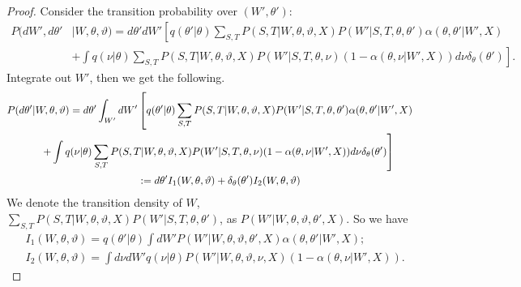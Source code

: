 \begin{proof}
Consider the transition probability over $(W',\theta')$:
\begin{align*}
  P(dW', d\theta'&| W, \theta, \vartheta)
=d\theta' dW' \left[q(\theta' | \theta)
  \sum_{S,T} P(S, T | W, \theta, \vartheta, X)P(W' | S, T, \theta, \theta')
\alpha(\theta, \theta' | W', X)\right. \\
&\left.+ \int q(\nu | \theta) \sum_{S,T} P(S, T|W,\theta,\vartheta,
    X)P(W' | S, T, \theta, \nu) ( 1 - {\alpha(\theta, \nu | W', X)})d\nu
    \delta_\theta(\theta')\right].
\end{align*}
Integrate out $W'$, then we get the following.
\begin{align*}
  P(d\theta'| W, \theta, \vartheta) =d\theta' \int_{W'}dW'&
  \left[q(\theta' | \theta)
    \sum_{S,T} P(S, T | W, \theta, \vartheta, X)P(W' | S, T, \theta,
  \theta')\alpha(\theta, \theta' | W', X)\right.\\
  &\hspace{-1.3in}\left.  + \int q(\nu | \theta) \sum_{S,T} P(S, T |  W, \theta, \vartheta,
X)P(W' | S, T, \theta, \nu) ( 1 - \alpha(\theta, \nu | W', X))d\nu
\delta_\theta(\theta')\right] \\
&:= d\theta' I_1(W, \theta, \vartheta) + \delta_\theta(\theta')I_2(W, \theta, \vartheta)
\end{align*}
We denote the transition density of $W$, $\sum_{S,T} P(S, T | W, \theta, \vartheta, X)P(W' | S, T, \theta, \theta')$, as $P(W' | W, \theta, \vartheta, \theta', X)$. So we have
\begin{align*}
&I_1(W, \theta, \vartheta) = q(\theta' | \theta)\int dW'P(W' | W, \theta, \vartheta, \theta', X)\alpha(\theta, \theta' | W', X); \\
&I_2(W, \theta, \vartheta) =\int d\nu  dW'q(\nu | \theta)P(W' | W, \theta, \vartheta, \nu, X)(1 - \alpha(\theta, \nu | W', X)).
\end{align*}


\end{proof}
